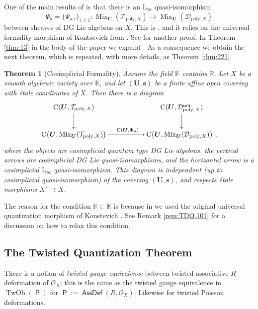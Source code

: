 \documentclass[a4paper, 10pt]{amsart}
\newtheorem{thm}[equation]{Theorem}
\theoremstyle{definition}
\numberwithin{equation}{section}
\newcommand{\opn}{\operatorname}
\newcommand{\cat}[1]{\operatorname{\mathsf{#1}}}
\newcommand{\mcal}[1]{\mathcal{#1}}
\newcommand{\mrm}[1]{\mathrm{#1}}
\newcommand{\mbb}[1]{\mathbb{#1}}
\newcommand{\tup}[1]{\textup{#1}}
\newcommand{\bsym}[1]{\boldsymbol{#1}}
\newcommand{\K}{\mbb{K}}
\newcommand{\R}{\mbb{R}}
\newcommand{\twocat}[1]{\operatorname{\bsym{\cat{#1}}}}
\begin{document}
One of the main results of \cite{Ye1} is that there is an 
$\mrm{L}_{\infty}$ quasi-isomorphism
\[ \Psi_{\bsym{s}} = \{ \Psi_{\bsym{s}; i} \}_{i \geq 1} :
\opn{Mix}_{\bsym{U}}(\mcal{T}_{\mrm{poly}, X}) \to 
\opn{Mix}_{\bsym{U}}(\mcal{D}_{\mrm{poly}, X})  \]
between sheaves of DG Lie algebras on $X$. 
This is \cite[Theorem 0.2]{Ye1}, and it relies on the universal formality
morphism of Kontsevich from \cite{Ko1}. See \cite[Theorem 1.1]{VdB} for
another proof. In Theorem \ref{thm:13} in the body of the paper we expand
\cite[Theorem 0.2]{Ye1}. As a consequence we obtain the next theorem, which is
repeated, with more details, as Theorem \ref{thm:221}.

\begin{thm}[Cosimplicial Formality] \label{thm:22}
Assume the field $\K$ contains $\R$.
Let $X$ be a smooth algebraic variety over $\K$, and let
$(\bsym{U}, \bsym{s})$ be a finite affine open covering with
\'etale coordinates of $X$. Then there is a diagram
\[ \UseTips \xymatrix @C=12ex @R=5ex {
\mrm{C}(\bsym{U}, \mcal{T}_{\mrm{poly}, X})
\ar[d]
&
\mrm{C}(\bsym{U}, \mcal{D}_{\mrm{poly}, X}^{\mrm{nor}})
\ar[d]
\\
\mrm{C} \bigl( \bsym{U} , \opn{Mix}_{\bsym{U}}(\mcal{T}_{\mrm{poly}, X})
\bigr)
\ar[r]^{\mrm{C}(\bsym{U} , \Psi_{\bsym{s}})} 
&
\mrm{C} \bigl( \bsym{U} , \opn{Mix}_{\bsym{U}}(\mcal{D}_{\mrm{poly}, X})
\bigr) \ ,
} \]
where the objects are cosimplicial quantum type DG Lie algebras, the
vertical arrows are cosimplicial DG Lie quasi-isomorphisms, and the horizontal
arrow is a cosimplicial $\mrm{L}_{\infty}$ quasi-isomorphism. 
This diagram is independent \tup{(}up to cosimplicial quasi-isomorphism\tup{)}
of the covering $(\bsym{U}, \bsym{s})$, and respects \'etale morphisms 
$X' \to X$.
\end{thm}

The reason for the condition $\R \subset \K$ is because in \cite{Ye1}
we used the original universal quantization morphism of Konstevich \cite{Ko1}. 
See Remark \ref{rem:TDQ.101} for a discussion on how to relax this condition.


\subsection{The Twisted Quantization Theorem} \label{subsec:TDQ}
There is a notion of {\em twisted gauge equivalence} between  
twisted associative $R$-deformation of $\mcal{O}_X$; this is the same as the 
twisted gauge equivalence in 
$\opn{TwOb}(\twocat{P})$ for 
$\twocat{P} := \twocat{AssDef}(R, \mcal{O}_X)$.
Likewise for twisted Poisson deformations. 
\end{document}
